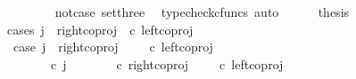 \begin{isabellebody}
\ \ \ \ \ \ \isamarkupfalse%
\ not{\isacharunderscore}{\kern0pt}case{}\ set{\isacharunderscore}{\kern0pt}three\ \isamarkupfalse%
\ {\isacharparenleft}{\kern0pt}typecheck{\isacharunderscore}{\kern0pt}cfuncs{\isacharcomma}{\kern0pt}\ auto{\isacharparenright}{\kern0pt}\isanewline
\ \ \ \ \isamarkupfalse%
\ {\isacharquery}{\kern0pt}thesis\isanewline
\ \ \ \ \isamarkupfalse%
{\isacharparenleft}{\kern0pt}cases\ {\isachardoublequoteopen}j\ {\isacharequal}{\kern0pt}\ {\isacharparenleft}{\kern0pt}right{\isacharunderscore}{\kern0pt}coproj\ {\isasymone}\ {\isacharparenleft}{\kern0pt}{\isasymone}{\isasymCoprod}{\isasymone}{\isacharparenright}{\kern0pt}{\isasymcirc}\isactrlsub c\ left{\isacharunderscore}{\kern0pt}coproj\ {\isasymone}\ {\isasymone}{\isacharparenright}{\kern0pt}{\isachardoublequoteclose}{\isacharparenright}{\kern0pt}\isanewline
\ \ \ \ \ \ \isamarkupfalse%
\ case{}{\isacharcolon}{\kern0pt}\ {\isachardoublequoteopen}j\ {\isacharequal}{\kern0pt}\ right{\isacharunderscore}{\kern0pt}coproj\ {\isasymone}\ {\isacharparenleft}{\kern0pt}{\isasymone}\ {\isasymCoprod}\ {\isasymone}{\isacharparenright}{\kern0pt}\ {\isasymcirc}\isactrlsub c\ left{\isacharunderscore}{\kern0pt}coproj\ {\isasymone}\ {\isasymone}{\isachardoublequoteclose}\isanewline
\ \ \ \ \ \ \isamarkupfalse%
\ {\isachardoublequoteopen}{\isasymlangle}{\isasymt}{\isacharcomma}{\kern0pt}\ {\isasymf}{\isasymrangle}\ {\isacharequal}{\kern0pt}\ {\isasymlangle}{\isasymf}{\isacharcomma}{\kern0pt}{\isasymf}{\isasymrangle}{\isachardoublequoteclose}\isanewline
\ \ \ \ \ \ \isamarkupfalse%
\ {\isacharminus}{\kern0pt}\ \isanewline
\ \ \ \ \ \ \ \ \isamarkupfalse%
\ {\isachardoublequoteopen}{\isacharparenleft}{\kern0pt}{\isasymlangle}{\isasymt}{\isacharcomma}{\kern0pt}\ {\isasymt}{\isasymrangle}{\isasymamalg}\ {\isacharparenleft}{\kern0pt}{\isasymlangle}{\isasymt}{\isacharcomma}{\kern0pt}\ {\isasymf}{\isasymrangle}\ {\isasymamalg}{\isasymlangle}{\isasymf}{\isacharcomma}{\kern0pt}\ {\isasymt}{\isasymrangle}{\isacharparenright}{\kern0pt}{\isacharparenright}{\kern0pt}\ {\isasymcirc}\isactrlsub c\ j\ {\isacharequal}{\kern0pt}\ {\isacharparenleft}{\kern0pt}{\isacharparenleft}{\kern0pt}{\isasymlangle}{\isasymt}{\isacharcomma}{\kern0pt}\ {\isasymt}{\isasymrangle}{\isasymamalg}\ {\isacharparenleft}{\kern0pt}{\isasymlangle}{\isasymt}{\isacharcomma}{\kern0pt}\ {\isasymf}{\isasymrangle}\ {\isasymamalg}{\isasymlangle}{\isasymf}{\isacharcomma}{\kern0pt}\ {\isasymt}{\isasymrangle}{\isacharparenright}{\kern0pt}{\isacharparenright}{\kern0pt}\ {\isasymcirc}\isactrlsub c\ right{\isacharunderscore}{\kern0pt}coproj\ {\isasymone}\ {\isacharparenleft}{\kern0pt}{\isasymone}\ {\isasymCoprod}\ {\isasymone}{\isacharparenright}{\kern0pt}{\isacharparenright}{\kern0pt}\ {\isasymcirc}\isactrlsub c\ left{\isacharunderscore}{\kern0pt}coproj\ {\isasymone}\ {\isasymone}{\isachardoublequoteclose}\isanewline

\end{isabellebody}
